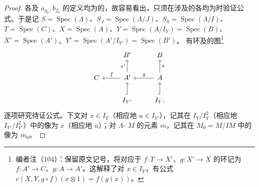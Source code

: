\begin{proof}
各及 $a_{g_0},b_{f_0}$ 的定义均为的，故容易看出，只须在涉及的各均为时验证公式。于是记 $S=\operatorname{Spec}(\Lambda)$、$S_J=\operatorname{Spec}(\Lambda/J)$、$S_0=\operatorname{Spec}(\Lambda/I)$、$T=\operatorname{Spec}(C)$、$X=\operatorname{Spec}(A)$、$Y=\operatorname{Spec}(A/I_Y)=\operatorname{Spec}(B)$、$X'=\operatorname{Spec}(A')$、$Y'=\operatorname{Spec}(A'/I_{Y'})=\operatorname{Spec}(B')$。
有环及的图\footnote{编者注（104）：保留原文记号，将对应于 $f:T\to X'$、$g:X'\to X$ 的环记为 $f:A'\to C$、$g:A\to A'$。这解释了对 $x\in I_Y$，有公式 $c(X,Y,g\circ f)(x\otimes1)=f(g(x))$。}
\[
\begin{tikzcd}
&B'&B\\
C&A'\arrow[l,"f"']\arrow[u,"\pi'"]&A\arrow[l,"g"']\arrow[u,"\pi"']\\
&I_{Y'}\arrow[u,hook]&I_Y\arrow[u,hook].
\end{tikzcd}
\]
逐项研究待证公式。下文对 $x\in I_Y$（相应地 $u\in I_{Y'}$），记其在 $I_Y/I_Y^2$（相应地 $I_{Y'}/I_{Y'}^2$）中的像为 $\overline x$（相应地 $\overline u$）；对 $\Lambda$- $M$ 的元素 $m$，记其在 $M_0=M/IM$ 中的像为 $m_0$。


\end{proof}
